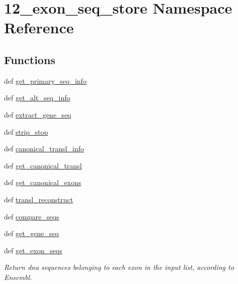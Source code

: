 \hypertarget{namespace12__exon__seq__store}{\section{12\-\_\-exon\-\_\-seq\-\_\-store Namespace Reference}
\label{namespace12__exon__seq__store}
}
\subsection*{Functions}
\begin{DoxyCompactItemize}
\item 
def \hyperlink{namespace12__exon__seq__store_aa683a56ce5b02b6140dcff8940a5fd7e}{get\-\_\-primary\-\_\-seq\-\_\-info}
\item 
def \hyperlink{namespace12__exon__seq__store_a7e07147d33945c4af6b7ad2abaf3cd85}{get\-\_\-alt\-\_\-seq\-\_\-info}
\item 
def \hyperlink{namespace12__exon__seq__store_a6e2645c20b8ecb2f7644276caa025214}{extract\-\_\-gene\-\_\-seq}
\item 
def \hyperlink{namespace12__exon__seq__store_aba2efa8f46ef665d66b5f51a0deac1a0}{strip\-\_\-stop}
\item 
def \hyperlink{namespace12__exon__seq__store_a0b65b4fd52a3291d2086528cc1f47858}{canonical\-\_\-transl\-\_\-info}
\item 
def \hyperlink{namespace12__exon__seq__store_acf44dc16c6b297ff8db54e486dfd0fba}{get\-\_\-canonical\-\_\-transl}
\item 
def \hyperlink{namespace12__exon__seq__store_a9573a058a9f0bde8a68724ce31cc3093}{get\-\_\-canonical\-\_\-exons}
\item 
def \hyperlink{namespace12__exon__seq__store_a163f10dd9974fa59e5dcb0702b722de6}{transl\-\_\-reconstruct}
\item 
def \hyperlink{namespace12__exon__seq__store_acf9f17f2aa3d0f54e3662c145a606a32}{compare\-\_\-seqs}
\item 
def \hyperlink{namespace12__exon__seq__store_a0a266b0c76b80904008c1ac963e9d8d4}{get\-\_\-gene\-\_\-seq}
\item 
def \hyperlink{namespace12__exon__seq__store_abf226158714d028315bb8905415f81f7}{get\-\_\-exon\-\_\-seqs}
\begin{DoxyCompactList}\small\item\em Return dna sequences belonging to each exon in the input list, according to Ensembl. \end{DoxyCompactList}\item 

\end{DoxyCompactItemize}
